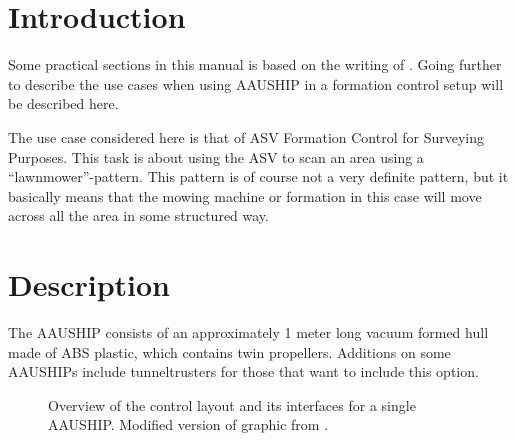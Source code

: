 \section{Introduction}

Some practical sections in this manual is based on the writing of
\cite{12gr730}. Going further to describe the use cases when using
AAUSHIP in a formation control setup will be described here.

The use case considered here is that of \ac{ASV} Formation Control for
Surveying Purposes. This task is about using the \ac{ASV} to scan an
area using a ``lawnmower''-pattern. This pattern is of course not a
very definite pattern, but it basically means that the mowing machine
or formation in this case will move across all the area in some structured way.

\section{Description} The AAUSHIP consists of an approximately 1 meter
long vacuum formed hull made of ABS plastic, which contains twin
propellers. Additions on some AAUSHIPs include tunneltrusters for
those that want to include this option.

\begin{figure}[htbp]
	
	\caption{Overview of the control layout and its interfaces for a
		single AAUSHIP.
		Modified version of graphic from \citep{12gr730}.}
	\label{fig:vessel-block-overview}
\end{figure}
